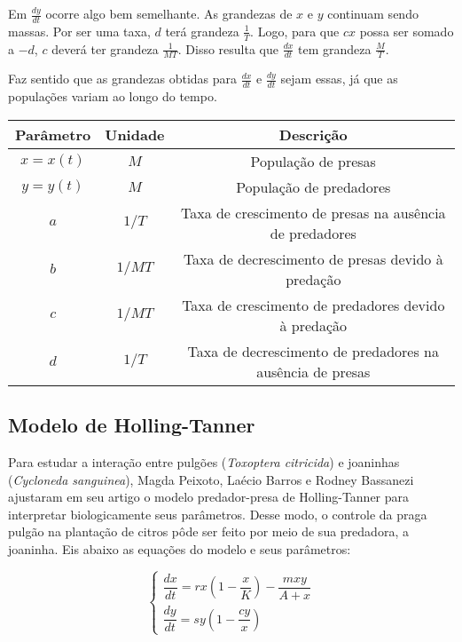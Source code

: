 Em $\frac{dy}{dt}$ ocorre algo bem semelhante. As grandezas de $x$ e $y$ continuam sendo massas. Por ser uma taxa, $d$ terá grandeza $\frac{1}{T}$. Logo, para que $cx$ possa ser somado a $-d$, $c$ deverá ter grandeza $\frac{1}{MT}$. Disso resulta que $\frac{dx}{dt}$ tem grandeza $\frac{M}{T}$.

Faz sentido que as grandezas obtidas para $\frac{dx}{dt}$ e $\frac{dy}{dt}$ sejam essas, já que as populações variam ao longo do tempo.

\begin{center}
\begin{tabular}{| c | c | c |}
\hline
Parâmetro & Unidade & Descrição\\
\hline
$x=x(t)$ & $M$ & População de presas\\
$y=y(t)$ & $M$ & População de predadores\\
$a$ & $1/T$ & Taxa de crescimento de presas na ausência de predadores\\
$b$ & $1/MT$ & Taxa de decrescimento de presas devido à predação\\
$c$ & $1/MT$ & Taxa de crescimento de predadores devido à predação\\
$d$ & $1/T$ & Taxa de decrescimento de predadores na ausência de presas\\
\hline
\end{tabular}
\end{center}

\newpage

\subsection{Modelo de Holling-Tanner}

Para estudar a interação entre pulgões (\textit{Toxoptera citricida}) e joaninhas (\textit{Cycloneda sanguinea}), Magda Peixoto, Laécio Barros e Rodney Bassanezi ajustaram em seu artigo \cite{mp_lb_rb_2005} o modelo predador-presa de Holling-Tanner para interpretar biologicamente seus parâmetros. Desse modo, o controle da praga pulgão na plantação de citros pôde ser feito por meio de sua predadora, a joaninha. Eis abaixo as equações do modelo e seus parâmetros:

$$\left\{
\begin{array}{l}
\dfrac{dx}{dt}=rx\left(1-\dfrac{x}{K}\right)-\dfrac{mxy}{A+x}\\
\dfrac{dy}{dt}=sy\left(1-\dfrac{cy}{x}\right)
\end{array}
\right.$$

